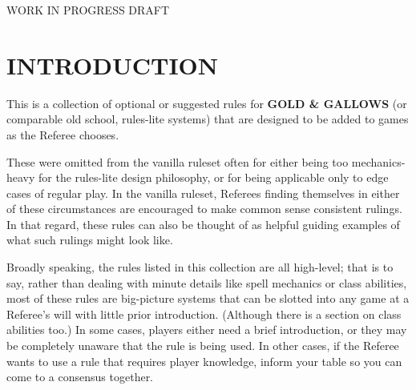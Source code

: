 \documentclass[twoside]{article}
\begin{document}
\begin{titlepage}
\centering

\phantom{x}

\vspace{1in}

{\myfonta\raisebox{1ex}{\large \phantom{Official}} }

\vspace{3ex}

{\myfontb{}}

WORK IN PROGRESS DRAFT
\end{titlepage}
\pagebreak

\restoregeometry
\begin{center}
\tableofcontents
\end{center}

\twocolumn

\section*{INTRODUCTION}

This is a collection of optional or suggested rules for \textbf{GOLD \& GALLOWS} (or comparable old school, rules-lite systems) that are designed to be added to games as the Referee chooses.

\bigbreak

These were omitted from the vanilla ruleset often for either being too mechanics-heavy for the rules-lite design philosophy, or for being applicable only to edge cases of regular play. In the vanilla ruleset, Referees finding themselves in either of these circumstances are encouraged to make common sense consistent rulings. In that regard, these rules can also be thought of as helpful guiding examples of what such rulings might look like.

\bigbreak

Broadly speaking, the rules listed in this collection are all high-level; that is to say, rather than dealing with minute details like spell mechanics or class abilities, most of these rules are big-picture systems that can be slotted into any game at a Referee's will with little prior introduction. (Although there is a section on class abilities too.) In some cases, players either need a brief introduction, or they may be completely unaware that the rule is being used. In other cases, if the Referee wants to use a rule that requires player knowledge, inform your table so you can come to a consensus together.
\end{document}
